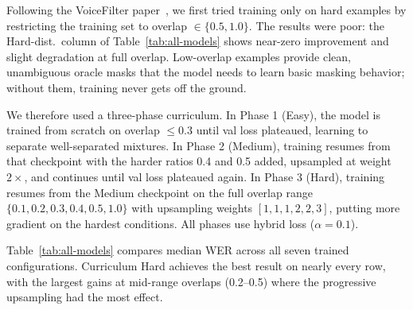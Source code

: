 \documentclass{article}
\begin{document}
Following the VoiceFilter paper~\citep{VoiceFilter}, we first tried training only on hard examples by restricting the training set to overlap $\in \{0.5, 1.0\}$. The results were poor: the Hard-dist.\ column of Table~\ref{tab:all-models} shows near-zero improvement and slight degradation at full overlap. Low-overlap examples provide clean, unambiguous oracle masks that the model needs to learn basic masking behavior; without them, training never gets off the ground.

We therefore used a three-phase curriculum. In Phase 1 (Easy), the model is trained from scratch on overlap $\leq 0.3$ until val loss plateaued, learning to separate well-separated mixtures. In Phase 2 (Medium), training resumes from that checkpoint with the harder ratios 0.4 and 0.5 added, upsampled at weight $2\times$, and continues until val loss plateaued again. In Phase 3 (Hard), training resumes from the Medium checkpoint on the full overlap range $\{0.1, 0.2, 0.3, 0.4, 0.5, 1.0\}$ with upsampling weights $[1, 1, 1, 2, 2, 3]$, putting more gradient on the hardest conditions. All phases use hybrid loss ($\alpha = 0.1$).

Table~\ref{tab:all-models} compares median WER across all seven trained configurations. Curriculum Hard achieves the best result on nearly every row, with the largest gains at mid-range overlaps (0.2--0.5) where the progressive upsampling had the most effect.
\end{document}

